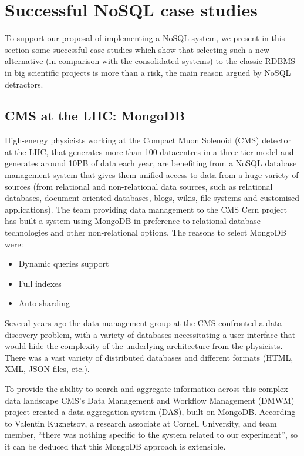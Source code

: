 \chapter{Successful NoSQL case studies}

To support our proposal of implementing a NoSQL system, we present in this section some successful case studies which show that selecting such a new alternative (in comparison with the consolidated systems) to the classic RDBMS in big scientific projects is more than a risk, the main reason argued by NoSQL detractors.


\section{CMS at the LHC: MongoDB}

High-energy physicists working at the Compact Muon Solenoid (CMS) detector at the LHC, that generates more than 100 datacentres in a three-tier model and generates around 10PB of data each year, are benefiting from a NoSQL database management system that gives them unified access to data from a huge variety of sources (from relational and non-relational data sources, such as relational databases, document-oriented databases, blogs, wikis, file systems and customised applications). The team providing data management to the CMS Cern project has built a system using MongoDB in preference to relational database technologies and other non-relational options. The reasons to select MongoDB were:

\begin{itemize}
\item Dynamic queries support
\item Full indexes
\item Auto-sharding
\end{itemize}

Several years ago the data management group at the CMS confronted a data discovery problem, with a variety of databases necessitating a user interface that would hide the complexity of the underlying architecture from the physicists. There was a vast variety of distributed databases and different formats (HTML, XML, JSON files, etc.).

To provide the ability to search and aggregate information across this complex data landscape CMS's Data Management and Workflow Management (DMWM) project created a data aggregation system (DAS), built on MongoDB.  According to Valentin Kuznetsov, a research associate at Cornell University, and team member, ``there was nothing specific to the system related to our experiment'', so it can be deduced that this MongoDB approach is extensible. 




